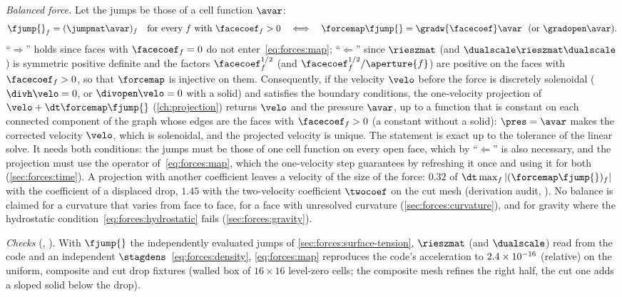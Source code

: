 \emph{Balanced force.} Let the jumps be those of a cell function $\avar$:
\begin{equation}\label{eq:forces:balance}
  \fjump{}_f=(\jumpmat\avar)_f\quad\text{for every }f\text{ with }\facecoef_f>0
  \quad\Longleftrightarrow\quad
  \forcemap\fjump{}=\gradw{\facecoef}\avar\ \ (\text{or }\gradopen\avar).
\end{equation}
``$\Rightarrow$'' holds since faces with $\facecoef_f=0$ do not
enter~\cref{eq:forces:map}; ``$\Leftarrow$'' since $\rieszmat$ (and
$\dualscale\rieszmat\dualscale$) is symmetric positive definite and the
factors $\facecoef_f^{1/2}$ (and $\facecoef_f^{1/2}/\aperture{f}$) are
positive on the faces with $\facecoef_f>0$, so that $\forcemap$ is
injective on them. Consequently, if the velocity $\velo$ before the force is
discretely solenoidal ($\divh\velo=0$, or $\divopen\velo=0$ with a solid)
and satisfies the boundary conditions, the one-velocity projection of
$\velo+\dt\forcemap\fjump{}$ (\cref{ch:projection}) returns $\velo$ and the
pressure $\avar$, up to a function that is constant on each connected
component of the graph whose edges are the faces with $\facecoef_f>0$ (a
constant without a solid): $\pres=\avar$ makes the corrected velocity
$\velo$, which is solenoidal, and the projected velocity is unique. The
statement is exact up to the tolerance of the linear solve. It needs both
conditions: the jumps must be those of one cell function on every open
face, which by ``$\Leftarrow$'' is also necessary, and the projection must
use the operator of~\cref{eq:forces:map}, which the one-velocity step
guarantees by refreshing it once and using it for both
(\cref{sec:forces:time}). A projection with another coefficient leaves a
velocity of the size of the force: $0.32$ of
$\dt\max_f\abs{(\forcemap\fjump{})_f}$ with the coefficient of a displaced
drop, $1.45$ with the two-velocity coefficient $\twocoef$ on the cut mesh
(derivation audit, ). No balance is
claimed for a curvature that varies from face to face, for a face with
unresolved curvature (\cref{sec:forces:curvature}), and for gravity where the
hydrostatic condition~\cref{eq:forces:hydrostatic} fails
(\cref{sec:forces:gravity}).

\emph{Checks} (, ). With
$\fjump{}$ the independently evaluated jumps of
\cref{sec:forces:surface-tension}, $\rieszmat$ (and $\dualscale$) read from
the code and an independent $\stagdens$~\cref{eq:forces:density},
\cref{eq:forces:map} reproduces the code's acceleration to $2.4\times10^{-16}$
(relative) on the uniform, composite and cut drop fixtures (walled box of
$16\times16$ level-zero cells; the composite mesh refines the right half,
the cut one adds a sloped solid below the drop).

